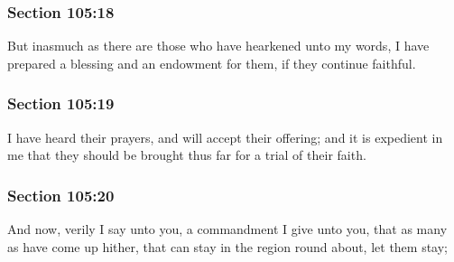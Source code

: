 	\subsubsection{Section 105:18} %
		\label{DC105-18}

		But inasmuch as there are those who have hearkened unto my words, I have prepared a blessing and an endowment for them, if they continue faithful.


	\subsubsection{Section 105:19} %
		\label{DC105-19}

		I have heard their prayers, and will accept their offering; and it is expedient in me that they should be brought thus far for a trial of their faith.


	\subsubsection{Section 105:20} %
		\label{DC105-20}

		And now, verily I say unto you, a commandment I give unto you, that as many as have come up hither, that can stay in the region round about, let them stay;


